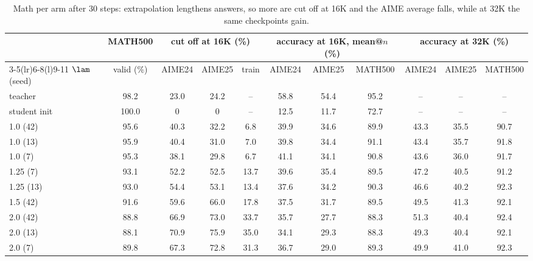 \begin{table}[t]
\centering\small
\setlength{\tabcolsep}{3.5pt}
\begin{tabular}{@{}l c ccc ccc ccc@{}}
\toprule
 & MATH500 & \multicolumn{3}{c}{cut off at 16K (\%)} & \multicolumn{3}{c}{accuracy at 16K, mean@$n$ (\%)} & \multicolumn{3}{c}{accuracy at 32K (\%)} \\
\cmidrule(lr){3-5}\cmidrule(lr){6-8}\cmidrule(l){9-11}
$\lam$ (seed) & valid (\%) & AIME24 & AIME25 & train & AIME24 & AIME25 & MATH500 & AIME24 & AIME25 & MATH500 \\
\midrule
teacher & 98.2 & 23.0 & 24.2 & -- & 58.8 & 54.4 & 95.2 & -- & -- & -- \\
student init & 100.0 & 0 & 0 & -- & 12.5 & 11.7 & 72.7 & -- & -- & -- \\
1.0 (42) & 95.6 & 40.3 & 32.2 & 6.8 & 39.9 & 34.6 & 89.9 & 43.3 & 35.5 & 90.7 \\
1.0 (13) & 95.9 & 40.4 & 31.0 & 7.0 & 39.8 & 34.4 & 91.1 & 43.4 & 35.7 & 91.8 \\
1.0 (7) & 95.3 & 38.1 & 29.8 & 6.7 & 41.1 & 34.1 & 90.8 & 43.6 & 36.0 & 91.7 \\
1.25 (7) & 93.1 & 52.2 & 52.5 & 13.7 & 39.6 & 35.4 & 89.5 & 47.2 & 40.5 & 91.2 \\
1.25 (13) & 93.0 & 54.4 & 53.1 & 13.4 & 37.6 & 34.2 & 90.3 & 46.6 & 40.2 & 92.3 \\
1.5 (42) & 91.6 & 59.6 & 66.0 & 17.8 & 37.5 & 31.7 & 89.5 & 49.5 & 41.3 & 92.1 \\
2.0 (42) & 88.8 & 66.9 & 73.0 & 33.7 & 35.7 & 27.7 & 88.3 & 51.3 & 40.4 & 92.4 \\
2.0 (13) & 88.1 & 70.9 & 75.9 & 35.0 & 34.1 & 29.3 & 88.3 & 49.3 & 40.4 & 92.1 \\
2.0 (7) & 89.8 & 67.3 & 72.8 & 31.3 & 36.7 & 29.0 & 89.3 & 49.9 & 41.0 & 92.3 \\
\bottomrule
\end{tabular}
\caption{Math per arm after 30 steps: extrapolation lengthens answers, so more are cut off at 16K and the AIME average falls, while at 32K the same checkpoints gain.}
\label{tab:d5_arms}
\end{table}
